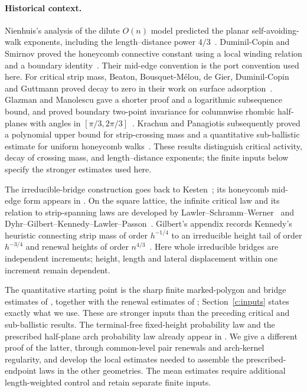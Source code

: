 \documentclass[11pt]{article}
\numberwithin{equation}{section}
\theoremstyle{definition}\newtheorem{definition}[theorem]{Definition}
\theoremstyle{remark}\newtheorem{remark}[theorem]{Remark}
\begin{document}
\paragraph{Historical context.}
Nienhuis's analysis of the dilute $O(n)$ model predicted the planar
self-avoiding-walk exponents, including the length--distance power
$4/3$~\cite{Nienhuis1982}. Duminil-Copin and Smirnov proved the honeycomb
connective constant using a local winding relation and a boundary
identity~\cite{DuminilCopinSmirnov2012}. Their mid-edge convention is the
port convention used here. For critical strip mass, Beaton, Bousquet-M\'elou, de Gier,
Duminil-Copin and Guttmann proved decay to zero in their work on surface
adsorption~\cite{BeatonEtAl2014}. Glazman and Manolescu gave a shorter
proof and a logarithmic subsequence bound, and proved boundary two-point
invariance for columnwise rhombic half-planes with angles in
$[\pi/3,2\pi/3]$~\cite{GlazmanManolescu2017}. Krachun and Panagiotis
subsequently proved a polynomial upper bound for strip-crossing mass
and a quantitative sub-ballistic estimate for uniform honeycomb
walks~\cite{KrachunPanagiotis2026}. These results distinguish critical
activity, decay of crossing mass, and length--distance exponents;
the finite inputs below specify the stronger estimates used here.

The irreducible-bridge construction goes back to
Kesten~\cite{Kesten1963}; its honeycomb mid-edge form appears in
\cite[Appendix]{BeatonEtAl2014}. On the square lattice, the infinite
critical law and its relation to strip-spanning laws are developed by
Lawler--Schramm--Werner~\cite[Appendix]{LawlerSchrammWerner2004} and
Dyhr--Gilbert--Kennedy--Lawler--Passon~\cite[Section 2.4]{DyhrEtAl2011}.
Gilbert's appendix records Kennedy's heuristic connecting strip mass
of order $h^{-1/4}$ to an irreducible height tail of order $h^{-3/4}$
and renewal heights of order $n^{4/3}$~\cite[Appendix]{Gilbert2015}.
Here whole irreducible bridges are independent increments; height,
length and lateral displacement within one increment remain dependent.

The quantitative starting point is the sharp finite marked-polygon and
bridge estimates of \cite{UniformMarked}, together with the renewal
estimates of \cite{Renewal}; Section~\ref{c:inputs} states exactly what
we use. These are stronger inputs than the preceding critical and
sub-ballistic results. The terminal-free fixed-height probability law
and the prescribed half-plane arch probability law already appear in
\cite[Propositions 5.7 and 5.8]{Renewal}. We give a different proof of the
latter, through common-level pair renewals and arch-kernel regularity,
and develop the local estimates needed to assemble the prescribed-endpoint
laws in the other geometries. The mean estimates require additional
length-weighted control and retain separate finite inputs.
\end{document}
